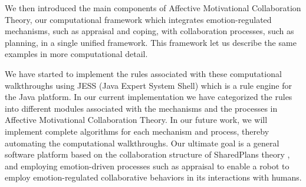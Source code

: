 We then introduced the main components of Affective Motivational Collaboration
Theory, our computational framework which integrates emotion-regulated
mechanisms, such as appraisal and coping, with collaboration processes, such as
planning, in a single unified framework. This framework let us describe the same
examples in more computational detail.

We have started to implement the rules associated with these computational
walkthroughs using JESS (Java Expert System Shell) which is a rule engine for
the Java platform. In our current implementation we have categorized the rules
into different modules associated with the mechanisms and the processes in
Affective Motivational Collaboration Theory. In our future work, we will
implement complete algorithms for each mechanism and process, thereby automating
the computational walkthroughs. Our ultimate goal is a general software platform
based on the collaboration structure of SharedPlans theory
\cite{grosz:discourse-structure}, and employing emotion-driven processes such as
appraisal \cite{marsella:ema-process-model} to enable a robot to employ
emotion-regulated collaborative behaviors in its interactions with humans.




%
%





